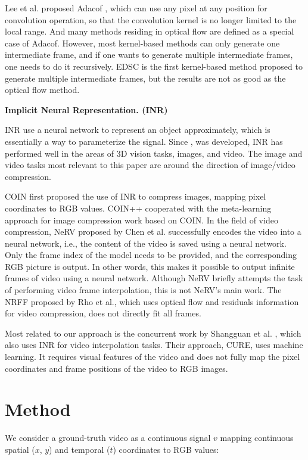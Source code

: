 \documentclass{article}
\begin{document}
Lee et al. proposed Adacof \cite{lee2020adacof}, which can use any pixel at any position for convolution operation,
so that the convolution kernel is no longer limited to the local range.
And many methods residing in optical flow are defined as a special case of Adacof.
However, most kernel-based methods can only generate one intermediate frame, and if one wants to generate multiple intermediate frames, one needs to do it recursively.
EDSC \cite{cheng2021multiple} is the first kernel-based method proposed to generate multiple intermediate frames, but the results are not as good as the optical flow method.


\textbf{ Implicit Neural Representation. (INR)}

INR use a neural network to represent an object approximately, which is essentially a way to parameterize the signal.
Since \cite{mildenhall2020nerf}, \cite{sitzmann2020implicit} was developed, INR has performed well in the areas of 3D vision tasks, images, and video.
The image and video tasks most relevant to this paper are around the direction of image/video compression.

COIN \cite{dupont2021coin} first proposed the use of INR to compress images, mapping pixel coordinates to RGB values.
COIN++ \cite{dupont2022coin++} cooperated with the meta-learning approach for image compression work based on COIN.
In the field of video compression, NeRV \cite{chen2021nerv} proposed by Chen et al. successfully encodes the video into a neural network, i.e., the content of the video is saved using a neural network.
Only the frame index of the model needs to be provided, and the corresponding RGB picture is output.
In other words, this makes it possible to output infinite frames of video using a neural network.
Although NeRV briefly attempts the task of performing video frame interpolation, this is not NeRV's main work.
The NRFF \cite{rho2022neural} proposed by Rho et al., which uses optical flow and residuals information for video compression, does not directly fit all frames.

Most related to our approach is the concurrent work by Shangguan et al. \cite{shangguan2022learning}, which also uses INR for video interpolation tasks.
Their approach, CURE, uses machine learning.
It requires visual features of the video and does not fully map the pixel coordinates and frame positions of the video to RGB images.


\section{Method}
\label{sec_method}
We consider a ground-truth video as a continuous signal $v$ mapping continuous spatial ($x$, $y$) and temporal ($t$) coordinates to RGB values:
\end{document}
